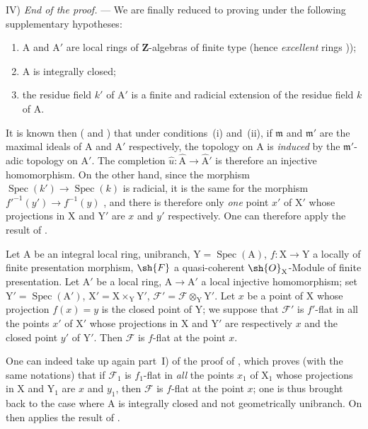 \begin{env}[11.7.1]
IV) \emph{End of the proof.} --- We are finally reduced to proving  under the following supplementary hypotheses:
\begin{enumerate}[label=(\roman*)]
  \item $\mathrm{A}$ and $\mathrm{A}'$ are local rings of $\mathbf{Z}$-algebras of finite type (hence \emph{excellent} rings ));
  \item $\mathrm{A}$ is integrally closed;
  \item the residue field $k'$ of $\mathrm{A}'$ is a finite and radicial extension of the residue field $k$ of $\mathrm{A}$.
\end{enumerate}

It is known then ( and ) that under conditions~(i) and~(ii), if $\mathfrak{m}$ and $\mathfrak{m}'$ are the maximal ideals of $\mathrm{A}$ and $\mathrm{A}'$ respectively, the topology on $\mathrm{A}$ is \emph{induced} by the $\mathfrak{m}'$-adic topology on $\mathrm{A}'$.
The completion $\hat{u}:\hat{\mathrm{A}}\to\hat{\mathrm{A}}'$ is therefore an injective homomorphism.
On the other hand, since the morphism $\operatorname{Spec}(k')\to\operatorname{Spec}(k)$ is radicial, it is the same for the morphism $f'^{-1}(y')\to f^{-1}(y)$ , and there is therefore only \emph{one} point $x'$ of $\mathrm{X}'$ whose projections in $\mathrm{X}$ and $\mathrm{Y}'$ are $x$ and $y'$ respectively.
One can therefore apply the result of .

\begin{corollary}[11.6.2]
\label{IV.11.6.2}
Let $\mathrm{A}$ be an integral local ring, unibranch, $\mathrm{Y}=\operatorname{Spec}(\mathrm{A})$, $f:\mathrm{X}\to\mathrm{Y}$ a locally of finite presentation morphism, $\sh{F}$ a quasi-coherent $\sh{O}_\mathrm{X}$-Module of finite presentation.
Let $\mathrm{A}'$ be a local ring, $\mathrm{A}\to\mathrm{A}'$ a local injective homomorphism; set $\mathrm{Y}'=\operatorname{Spec}(\mathrm{A}')$, $\mathrm{X}'=\mathrm{X}\times_\mathrm{Y}\mathrm{Y}'$, $\mathscr{F}'=\mathscr{F}\otimes_\mathrm{Y}\mathrm{Y}'$.
Let $x$ be a point of $\mathrm{X}$ whose projection $f(x)=y$ is the closed point of $\mathrm{Y}$; we suppose that $\mathscr{F}'$ is $f'$-flat in all the points $x'$ of $\mathrm{X}'$ whose projections in $\mathrm{X}$ and $\mathrm{Y}'$ are respectively $x$ and the closed point $y'$ of $\mathrm{Y}'$.
Then $\mathscr{F}$ is $f$-flat at the point $x$.
\end{corollary}

One can indeed take up again part~I) of the proof of , which proves (with the same notations) that if $\mathscr{F}_1$ is $f_1$-flat in \emph{all} the points $x_1$ of $\mathrm{X}_1$ whose projections in $\mathrm{X}$ and $\mathrm{Y}_1$ are $x$ and $y_1$, then $\mathscr{F}$ is $f$-flat at the point $x$; one is thus brought back to the case where $\mathrm{A}$ is integrally closed and not geometrically unibranch.
On then applies the result of .
\end{env}

